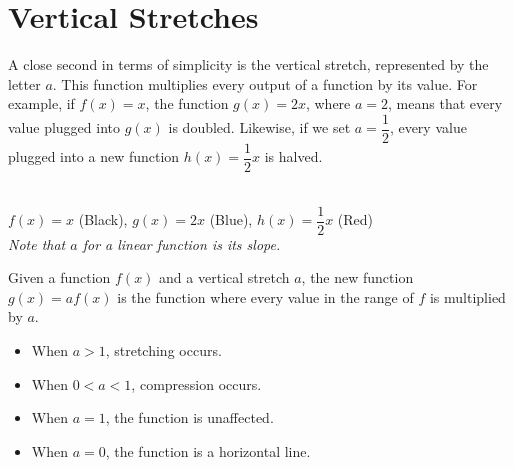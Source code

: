 \clearpage\section{Vertical Stretches}
A close second in terms of simplicity is the vertical stretch, represented by the letter $a$. This function multiplies every output of a function by its value. For example, if $f(x) = x$, the function $g(x) = 2x$, where $a = 2$, means that every value plugged into $g(x)$ is doubled. Likewise, if we set $a = \dfrac{1}{2}$, every value plugged into a new function $h(x) = \dfrac{1}{2}x$ is halved.
\begin{center}
    \\
    $f(x) = x$ (Black), 
    $g(x) = 2x$ (Blue),
    $h(x) = \dfrac{1}{2}x$ (Red) \\
    \textit{Note that $a$ for a linear function is its slope.}
\end{center}

\begin{definition}
    Given a function $f(x)$ and a vertical stretch $a$, the new function $g(x) = af(x)$ is the function where every value in the range of $f$ is multiplied by $a$.
    \begin{itemize}
        \item When $a > 1$, stretching occurs.
        \item When $0 < a < 1$, compression occurs.
        \item When $a = 1$, the function is unaffected. 
        \item When $a = 0$, the function is a horizontal line.
    \end{itemize}
\end{definition}

